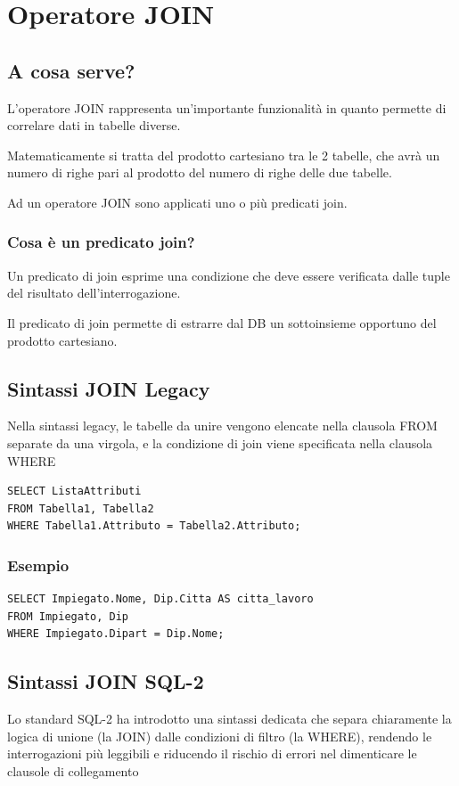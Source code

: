 \chapter{Operatore JOIN}
\section{A cosa serve?}
L'operatore JOIN rappresenta un'importante funzionalità in quanto permette di correlare dati in tabelle diverse.

Matematicamente si tratta del prodotto cartesiano tra le 2 tabelle, che avrà un numero di righe pari al prodotto del numero di righe delle due tabelle.

Ad un operatore JOIN sono applicati uno o più predicati join.

\subsection{Cosa è un predicato join?}
Un predicato di join esprime una condizione che deve essere verificata dalle tuple del risultato dell'interrogazione.

Il predicato di join permette di estrarre dal DB un sottoinsieme opportuno del prodotto cartesiano.

\section{Sintassi JOIN Legacy}
Nella sintassi legacy, le tabelle da unire vengono elencate nella clausola FROM separate da una virgola, e la condizione di join viene specificata nella clausola WHERE

\begin{lstlisting}[language=sql_generic]
SELECT ListaAttributi
FROM Tabella1, Tabella2
WHERE Tabella1.Attributo = Tabella2.Attributo;
\end{lstlisting}

\subsection{Esempio}
\begin{lstlisting}[language=sql_generic]
SELECT Impiegato.Nome, Dip.Citta AS citta_lavoro
FROM Impiegato, Dip
WHERE Impiegato.Dipart = Dip.Nome;
\end{lstlisting}

\section{Sintassi JOIN SQL-2}
Lo standard SQL-2 ha introdotto una sintassi dedicata che separa chiaramente la logica di unione (la JOIN) dalle condizioni di filtro (la WHERE), rendendo le interrogazioni più leggibili e riducendo il rischio di errori nel dimenticare le clausole di collegamento

